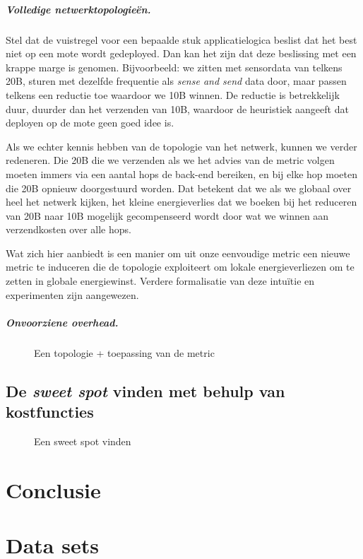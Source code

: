 \documentclass{article}
\begin{document}
\subparagraph{Volledige netwerktopologie\"en.}

Stel dat de vuistregel voor een bepaalde stuk applicatielogica beslist dat het
best niet op een mote wordt gedeployed. Dan kan het zijn dat deze beslissing met
een krappe marge is genomen. Bijvoorbeeld: we zitten met sensordata van telkens
20B, sturen met dezelfde frequentie als \textit{sense and send} data door, maar
passen telkens een reductie toe waardoor we 10B winnen. De reductie is
betrekkelijk duur, duurder dan het verzenden van 10B, waardoor de heuristiek
aangeeft dat deployen op de mote geen goed idee is. 

Als we echter kennis hebben van de topologie van het netwerk, kunnen we verder
redeneren. Die 20B die we verzenden als we het advies van de metric volgen
moeten immers via een aantal hops de back-end bereiken, en bij elke hop moeten
die 20B opnieuw doorgestuurd worden. Dat betekent dat we als we globaal over
heel het netwerk kijken, het kleine energieverlies dat we boeken bij het
reduceren van 20B naar 10B mogelijk gecompenseerd wordt door wat we winnen aan
verzendkosten over alle hops.

Wat zich hier aanbiedt is een manier om uit onze eenvoudige metric een nieuwe
metric te induceren die de topologie exploiteert om lokale energieverliezen om
te zetten in globale energiewinst. Verdere formalisatie van deze intu\"itie en
experimenten zijn aangewezen.

\subparagraph{Onvoorziene overhead.}

\begin{figure}[h]
\centering
\missingfigure{}
\caption{Een topologie + toepassing van de metric}
\label{fig:voorbeeld_topologie}
\end{figure}

\subsection{De \textit{sweet spot} vinden met behulp van kostfuncties}

\begin{figure}[h]
\centering
\missingfigure{}
\caption{Een sweet spot vinden}
\label{fig:sweet_spot}
\end{figure}

\section{Conclusie}


\nocite{*}


\newpage
\appendix
\section{Data sets}
\end{document}
